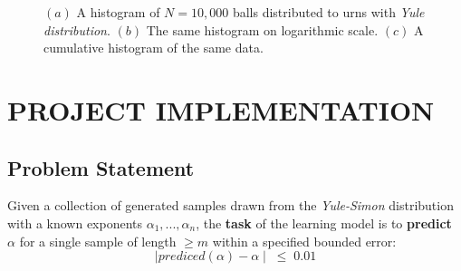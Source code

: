 \documentclass[a4paper, 12pt]{report}
\begin{document}
\begin{figure}[ht]
\centering
    \hspace{0.5cm}
    \hspace{0.5cm}
    \label{fig:yule-process-histograms}
    \caption[Yule process histograms]{
        $(a)$ A histogram of $N=10,000$ balls distributed to urns with \textit{Yule distribution}.
        $(b)$ The same histogram on logarithmic scale.
        $(c)$ A cumulative histogram of the same data.
    }
\end{figure}

\chapter{PROJECT IMPLEMENTATION}

\section{Problem Statement}
\par Given a collection of generated samples drawn from the \textit{Yule-Simon} distribution with a known exponents $\alpha_1,...,\alpha_n$, the \textbf{task} of the learning model is to \textbf{predict $\alpha$} for a single sample of length $\geq m$ within a specified bounded error:
$$\mid prediced(\alpha) - \alpha \mid \; \leq \; 0.01$$
\end{document}
